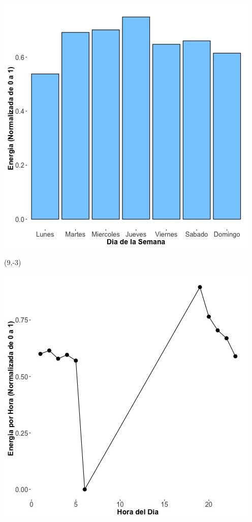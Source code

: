 \documentclass{article}\usepackage[]{graphicx}\usepackage[]{color}
\newenvironment{knitrout}{}{} %
\begin{document}
\begin{knitrout}
\color{fgcolor}
\includegraphics[scale=0.65]{figure/A22_day_of_week_plot} 
\end{knitrout}


 \begin{textblock}{1}(9,-3)
\begin{minipage}{20em}
\begingroup

\endgroup
\end{minipage}
\end{textblock}

 \vspace{2cm}

\begin{knitrout}
\color{fgcolor}
\includegraphics[scale=0.75]{figure/A22_fplot_norm_median} 
\end{knitrout}
\end{document}
